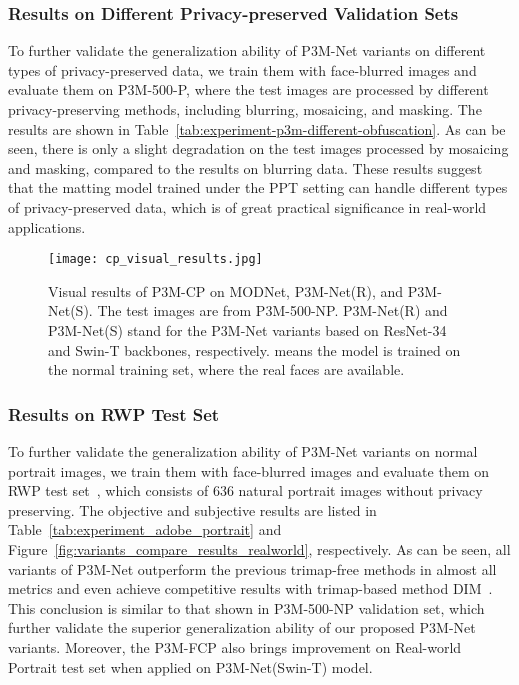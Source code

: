 \documentclass[twocolumn]{svjour3}
\begin{document}
\subsubsection{Results on Different Privacy-preserved Validation Sets}
To further validate the generalization ability of P3M-Net variants on different types of privacy-preserved data, we train them with face-blurred images and evaluate them on P3M-500-P, where
the test images are processed by different privacy-preserving
methods, including blurring, mosaicing, and masking. The results are shown in Table~\ref{tab:experiment-p3m-different-obfuscation}. As can be seen, there is only a slight degradation on the test images processed by mosaicing and masking, compared to the results on blurring data. These results suggest that the matting model trained under the PPT setting can handle different types of privacy-preserved data, which is of great practical significance in real-world applications.



\begin{figure*}[hbtp]
    \centering
    \texttt{[image: cp\_visual\_results.jpg]}
    \caption{Visual results of P3M-CP on MODNet, P3M-Net(R), and P3M-Net(S). The test images are from P3M-500-NP. P3M-Net(R) and P3M-Net(S) stand for the P3M-Net variants based on ResNet-34 and Swin-T backbones, respectively.  means the model is trained on the normal training set, where the real faces are available.}
    \label{fig:cp-results}
\end{figure*}



\subsubsection{Results on RWP Test Set}
To further validate the generalization ability of P3M-Net variants on normal portrait images, we train them with face-blurred images and evaluate them on RWP test set~\citep{yu2021mask}, which consists of 636 natural portrait images without privacy preserving. The objective and subjective results are listed in Table~\ref{tab:experiment_adobe_portrait} and Figure~\ref{fig:variants_compare_results_realworld}, respectively. As can be seen, all variants of P3M-Net outperform the previous trimap-free methods in almost all metrics and even achieve competitive results with trimap-based method DIM~\citep{dim}. This conclusion is similar to that shown in P3M-500-NP validation set, which further validate the superior generalization ability of our proposed P3M-Net variants. Moreover, the P3M-FCP also brings improvement on Real-world Portrait test set when applied on P3M-Net(Swin-T) model.
\end{document}
